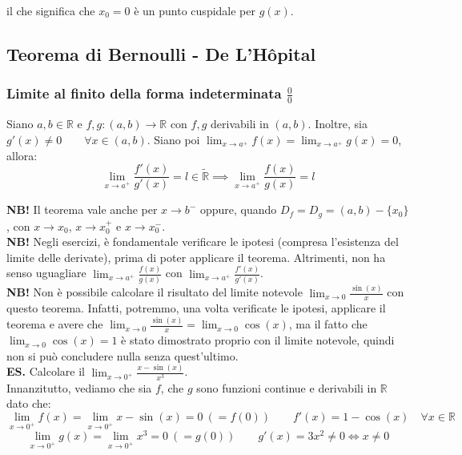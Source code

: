 \documentclass{article}
\begin{document}
\noindent il che significa che $x_0 = 0$ è un punto cuspidale per $g(x)$.

\subsection{Teorema di Bernoulli - De L'Hôpital}
\subsubsection{Limite al finito della forma indeterminata $\frac{0}{0}$}
Siano $a, b \in \mathbb{R}$ e $f, g: (a, b) \xrightarrow{} \mathbb{R}$ con $f, g$ derivabili in $(a, b)$. Inoltre, sia $g'(x) \neq 0 \qquad \forall x \in (a, b)$. Siano poi $\lim_{x \to a^+} f(x) = \lim_{x \to a^+} g(x) = 0$, allora:
\begin{equation*}
    \lim_{x \to a^+} \frac{f'(x)}{g'(x)} = l \in \widetilde{\mathbb{R}} \implies \lim_{x \to a^+} \frac{f(x)}{g(x)} = l
\end{equation*}

\noindent\textbf{NB!} Il teorema vale anche per $x \to b^-$ oppure, quando $D_f = D_g = (a, b) - \{x_0\}$, con $x \to x_0$, $x \to x_0^+$ e $x \to x_0^-$.\\

\noindent\textbf{NB!} Negli esercizi, è fondamentale verificare le ipotesi (compresa l'esistenza del limite delle derivate), prima di poter applicare il teorema. Altrimenti, non ha senso uguagliare $\lim_{x \to a^+} \frac{f(x)}{g(x)}$ con $\lim_{x \to a^+} \frac{f'(x)}{g'(x)}$.\\

\noindent\textbf{NB!} Non è possibile calcolare il risultato del limite notevole $\lim_{x \to 0} \frac{\sin(x)}{x}$ con questo teorema. Infatti, potremmo, una volta verificate le ipotesi, applicare il teorema e avere che $\lim_{x \to 0} \frac{\sin(x)}{x} = \lim_{x \to 0} \cos(x)$, ma il fatto che $\lim_{x \to 0} \cos(x) = 1$ è stato dimostrato proprio con il limite notevole, quindi non si può concludere nulla senza quest'ultimo.\\

\noindent\textbf{ES.} Calcolare il $\lim_{x \to 0^+} \frac{x - \sin(x)}{x^3}$.\\
Innanzitutto, vediamo che sia $f$, che $g$ sono funzioni continue e derivabili in $\mathbb{R}$ dato che:
\begin{equation*}
    \lim_{x \to 0^+} f(x) = \lim_{x \to 0^+} x - \sin(x) = 0 \ (= f(0)) \qquad f'(x) = 1 - \cos(x) \quad \forall x \in \mathbb{R}
\end{equation*}
\begin{equation*}
    \lim_{x \to 0^+} g(x) = \lim_{x \to 0^+} x^3 = 0 \ (= g(0)) \qquad g'(x) = 3x^2 \neq 0 \iff x \neq 0
\end{equation*}
\end{document}
